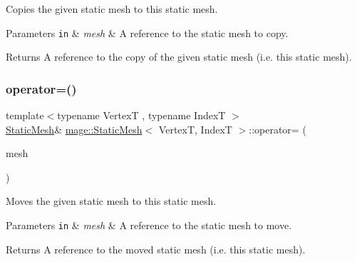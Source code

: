 Copies the given static mesh to this static mesh.


\begin{DoxyParams}[1]{Parameters}
\mbox{\tt in}  & {\em mesh} & A reference to the static mesh to copy. \\
\hline
\end{DoxyParams}
\begin{DoxyReturn}{Returns}
A reference to the copy of the given static mesh (i.\+e. this static mesh). 
\end{DoxyReturn}
\hypertarget{classmage_1_1_static_mesh_a12b9f307dc7e7f7567d37fe94a288f85}{}\label{classmage_1_1_static_mesh_a12b9f307dc7e7f7567d37fe94a288f85} 
\subsubsection{\texorpdfstring{operator=()}{operator=()}\hspace{0.1cm}{\footnotesize\ttfamily [2/2]}}
{\footnotesize\ttfamily template$<$typename VertexT , typename IndexT $>$ \\
\hyperlink{classmage_1_1_static_mesh}{Static\+Mesh}\& \hyperlink{classmage_1_1_static_mesh}{mage\+::\+Static\+Mesh}$<$ VertexT, IndexT $>$\+::operator= (\begin{DoxyParamCaption}\item[{\hyperlink{classmage_1_1_static_mesh}{Static\+Mesh}$<$ VertexT, IndexT $>$ \&\&}]{mesh }\end{DoxyParamCaption})\hspace{0.3cm}{\ttfamily [noexcept]}}

Moves the given static mesh to this static mesh.


\begin{DoxyParams}[1]{Parameters}
\mbox{\tt in}  & {\em mesh} & A reference to the static mesh to move. \\
\hline
\end{DoxyParams}
\begin{DoxyReturn}{Returns}
A reference to the moved static mesh (i.\+e. this static mesh). 
\end{DoxyReturn}
\hypertarget{classmage_1_1_static_mesh_af60eb028ed40e4bd6595edbee110bc7d}{}\label{classmage_1_1_static_mesh_af60eb028ed40e4bd6595edbee110bc7d} 
